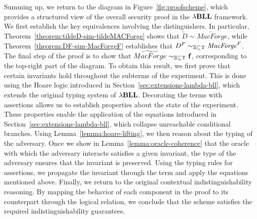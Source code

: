 Summing up, we return to the diagram in Figure~\ref{fig:proofscheme}, which provides a structured view of the overall security proof in the ${\lambda}\mathbf{BLL}$ framework. We first establish the key equivalences involving the distinguishers. In particular, Theorem~\ref{theorem:tildeD-sim-tildeMACForge} shows that $\widetilde{D} \sim \widetilde{MacForge}$, while Theorem~\ref{theorem:DF-sim-MacForgeF} establishes that $D^F \sim_{\Xi\subseteq\Upsilon} \mathit{MacForge}^F$. The final step of the proof is to show that $\widetilde{MacForge} \sim_{\Xi\subseteq\Upsilon} \mathbf{f}$, corresponding to the top-right part of the diagram. To obtain this result, we first prove that certain invariants hold throughout the subterms of the experiment. This is done using the Hoare logic introduced in Section~\ref{sec:extensions-lambda-bll}, which extends the original typing system of ${\lambda}\mathbf{BLL}$. Decorating the terms with assertions allows us to establish properties about the state of the experiment. These properties enable the application of the equations introduced in Section~\ref{sec:extensions-lambda-bll}, which collapse unreachable conditional branches. Using Lemma~\ref{lemma:hoare-lifting}, we then reason about the typing of the adversary. Once we show in Lemma~\ref{lemma:oracle-coherence} that the oracle with which the adversary interacts satisfies a given invariant, the type of the adversary ensures that the invariant is preserved. Using the typing rules for assertions, we propagate the invariant through the term and apply the equations mentioned above. Finally, we return to the original contextual indistinguishability reasoning. By mapping the behavior of each component in the proof to its counterpart through the logical relation, we conclude that the scheme satisfies the required indistinguishability guarantees.

